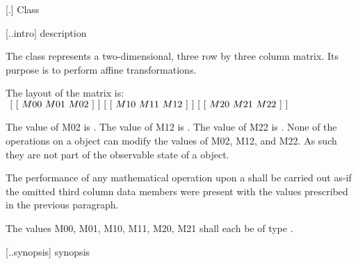  [\iotwod.\matrixtwod] {Class }

 [\iotwod.\matrixtwod.intro] { description}

%
\pnum
The  class represents a two-dimensional, three row by three column matrix. Its purpose is to perform affine transformations.

\pnum
The layout of the matrix is: \\
$
~[~[~M00~M01~M02~]~] \\
~[~[~M10~M11~M12~]~] \\
~[~[~M20~M21~M22~]~]$

\pnum
The value of M02 is . The value of M12 is . The value of M22 is . None of the operations on a  object can modify the values of M02, M12, and M22. As such they are not part of the observable state of a  object.

\pnum
The performance of any mathematical operation upon a  shall be carried out as-if the omitted third column data members were present with the values prescribed in the previous paragraph.

\pnum
The values M00, M01, M10, M11, M20, M21 shall each be of type .

 [\iotwod.\matrixtwod.synopsis] { synopsis}

